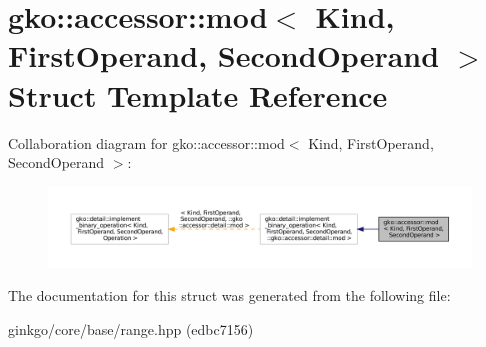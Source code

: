 \hypertarget{structgko_1_1accessor_1_1mod}{}\section{gko\+:\+:accessor\+:\+:mod$<$ Kind, First\+Operand, Second\+Operand $>$ Struct Template Reference}
\label{structgko_1_1accessor_1_1mod}


Collaboration diagram for gko\+:\+:accessor\+:\+:mod$<$ Kind, First\+Operand, Second\+Operand $>$\+:
\nopagebreak
\begin{figure}[H]
\begin{center}
\leavevmode
\includegraphics[width=350pt]{structgko_1_1accessor_1_1mod__coll__graph}
\end{center}
\end{figure}


The documentation for this struct was generated from the following file\+:\begin{DoxyCompactItemize}
\item 
ginkgo/core/base/range.\+hpp (edbc7156)\end{DoxyCompactItemize}
